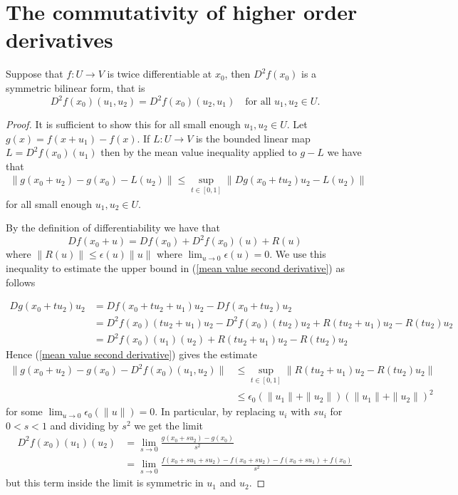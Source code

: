 \documentclass[twoside, a4paper, 10pt]{amsart}
\begin{document}
\section{The commutativity of higher order derivatives}

\begin{thm} Suppose that $f:U \to V$ is twice differentiable at $x_0$, then $D^2 f(x_0)$ is a symmetric bilinear form, that is $$D^2f(x_0)(u_1,u_2) = D^2f(x_0)(u_2,u_1) \quad \text{for all } u_1,u_2 \in U.$$  \end{thm}

\begin{proof} It is sufficient to show this for all small enough $u_1, u_2 \in U$. Let $g(x) = f(x + u_1) - f(x)$. If $L:U \to V$ is the bounded linear map $L = D^2f(x_0)(u_1)$ then by the mean value inequality applied to $g - L$ we have that \begin{align}\label{mean value second derivative} \| g(x_0 + u_2) - g(x_0) - L(u_2) \| \leq \sup_{t \in [0,1]} \| Dg(x_0 + tu_2)u_2 - L(u_2) \| \end{align} for all small enough $u_1, u_2 \in U$. 

By the definition of differentiability we have that $$Df(x_0 + u) = Df(x_0) + D^2f(x_0)(u) + R(u) $$ where $\| R(u) \| \leq \epsilon(u)\|u \|$ where $ \lim_{u \to 0} \epsilon(u) = 0$. We use this inequality to estimate the upper bound in (\ref{mean value second derivative}) as follows

\begin{align*} Dg(x_0 + tu_2)u_2 &= Df(x_0 + tu_2 + u_1)u_2 - Df(x_0 +tu_2)u_2 \\
 &= D^2f(x_0) (tu_2 + u_1)u_2 - D^2f(x_0)(tu_2)u_2 + R(tu_2 + u_1)u_2 - R(tu_2)u_2 \\ &= D^2f(x_0)(u_1)(u_2) + R(tu_2 + u_1)u_2 - R(tu_2)u_2  \end{align*} Hence (\ref{mean value second derivative}) gives the estimate \begin{align*} \| g(x_0 + u_2) - g(x_0) - D^2f(x_0)(u_1, u_2) \| & \leq \sup_{t \in [0,1]} \|  R(tu_2 + u_1)u_2 - R(tu_2)u_2 \| \\ & \leq \epsilon_0(\|u_1\| + \|u_2\|) (\|u_1 \| +  \|u_2 \|)^2  \end{align*} for some $\lim_{u \to 0} \epsilon_0(\|u \|) = 0$. In particular, by replacing $u_i$ with $s u_i$ for $0< s < 1$ and dividing by $s^2$ we get the limit \begin{align*} D^2f(x_0)(u_1)(u_2) &= \lim_{s \to 0} \frac{g(x_0 + su_2) - g(x_0)}{s^2} \\ &= \lim_{s \to 0} \frac{f(x_0 + su_1 + su_2) - f(x_0 + su_2) - f(x_0 + su_1) + f(x_0)}{s^2} \end{align*} but this term inside the limit is symmetric in $u_1$ and $u_2$. \end{proof}
\end{document}
